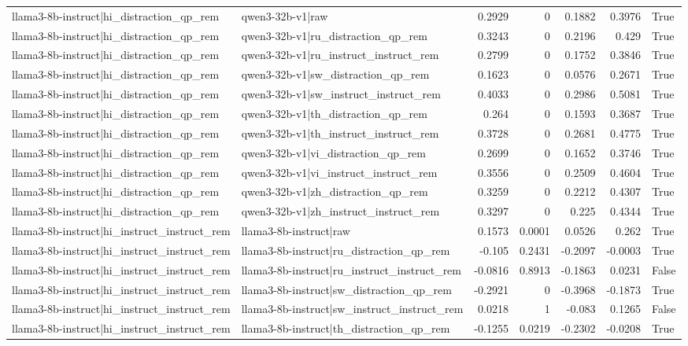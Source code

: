 \begin{table}
\begin{tabular}{l l r r r r l}
llama3-8b-instruct|hi_distraction_qp_rem & qwen3-32b-v1|raw & 0.2929 & 0 & 0.1882 & 0.3976 & True \\
llama3-8b-instruct|hi_distraction_qp_rem & qwen3-32b-v1|ru_distraction_qp_rem & 0.3243 & 0 & 0.2196 & 0.429 & True \\
llama3-8b-instruct|hi_distraction_qp_rem & qwen3-32b-v1|ru_instruct_instruct_rem & 0.2799 & 0 & 0.1752 & 0.3846 & True \\
llama3-8b-instruct|hi_distraction_qp_rem & qwen3-32b-v1|sw_distraction_qp_rem & 0.1623 & 0 & 0.0576 & 0.2671 & True \\
llama3-8b-instruct|hi_distraction_qp_rem & qwen3-32b-v1|sw_instruct_instruct_rem & 0.4033 & 0 & 0.2986 & 0.5081 & True \\
llama3-8b-instruct|hi_distraction_qp_rem & qwen3-32b-v1|th_distraction_qp_rem & 0.264 & 0 & 0.1593 & 0.3687 & True \\
llama3-8b-instruct|hi_distraction_qp_rem & qwen3-32b-v1|th_instruct_instruct_rem & 0.3728 & 0 & 0.2681 & 0.4775 & True \\
llama3-8b-instruct|hi_distraction_qp_rem & qwen3-32b-v1|vi_distraction_qp_rem & 0.2699 & 0 & 0.1652 & 0.3746 & True \\
llama3-8b-instruct|hi_distraction_qp_rem & qwen3-32b-v1|vi_instruct_instruct_rem & 0.3556 & 0 & 0.2509 & 0.4604 & True \\
llama3-8b-instruct|hi_distraction_qp_rem & qwen3-32b-v1|zh_distraction_qp_rem & 0.3259 & 0 & 0.2212 & 0.4307 & True \\
llama3-8b-instruct|hi_distraction_qp_rem & qwen3-32b-v1|zh_instruct_instruct_rem & 0.3297 & 0 & 0.225 & 0.4344 & True \\
llama3-8b-instruct|hi_instruct_instruct_rem & llama3-8b-instruct|raw & 0.1573 & 0.0001 & 0.0526 & 0.262 & True \\
llama3-8b-instruct|hi_instruct_instruct_rem & llama3-8b-instruct|ru_distraction_qp_rem & -0.105 & 0.2431 & -0.2097 & -0.0003 & True \\
llama3-8b-instruct|hi_instruct_instruct_rem & llama3-8b-instruct|ru_instruct_instruct_rem & -0.0816 & 0.8913 & -0.1863 & 0.0231 & False \\
llama3-8b-instruct|hi_instruct_instruct_rem & llama3-8b-instruct|sw_distraction_qp_rem & -0.2921 & 0 & -0.3968 & -0.1873 & True \\
llama3-8b-instruct|hi_instruct_instruct_rem & llama3-8b-instruct|sw_instruct_instruct_rem & 0.0218 & 1 & -0.083 & 0.1265 & False \\
llama3-8b-instruct|hi_instruct_instruct_rem & llama3-8b-instruct|th_distraction_qp_rem & -0.1255 & 0.0219 & -0.2302 & -0.0208 & True \\

\end{tabular}
\end{table}
